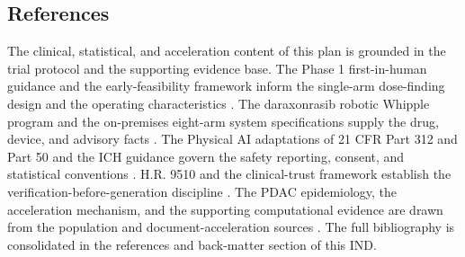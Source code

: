 \subsection{References}

The clinical, statistical, and acceleration content of this plan is grounded in the
trial protocol and the supporting evidence base. The Phase 1 first-in-human guidance
and the early-feasibility framework inform the single-arm dose-finding design and the
operating characteristics \cite{phase1guidance}. The daraxonrasib robotic Whipple
program and the on-premises eight-arm system specifications supply the drug, device,
and advisory facts \cite{daraxwhipple,onpremwhippl,oncotrialllm}. The Physical AI
adaptations of 21 CFR Part 312 and Part 50 and the ICH guidance govern the safety
reporting, consent, and statistical conventions \cite{cfr312paiuni,cfr050paiuni,ichpaistduni}.
H.R. 9510 and the clinical-trust framework establish the verification-before-generation
discipline \cite{congress9510,clintrustpai}. The PDAC epidemiology, the acceleration
mechanism, and the supporting computational evidence are drawn from the population
and document-acceleration sources \cite{pdac060s2030,paipredict4x,natlpaiplatf,paisitedocpk,paiautospons,llmcomp16fda,fdadigtwinpc,qspmetpancre,chatgpt100kp,pdacdigtwinp}.
The full bibliography is consolidated in the references and back-matter section of
this IND.

